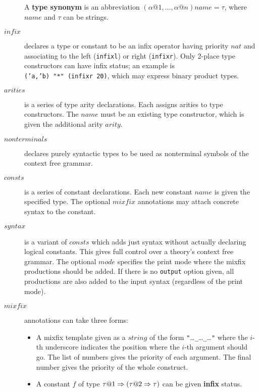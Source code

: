 \begin{description}
  A \textbf{type synonym} is an abbreviation
  $(\alpha@1,\dots,\alpha@n)name = \tau$, where $name$ and $\tau$ can
  be strings.

\item[$infix$]
  declares a type or constant to be an infix operator having priority $nat$
  and associating to the left (\texttt{infixl}) or right (\texttt{infixr}).
  Only 2-place type constructors can have infix status; an example is {\tt
  ('a,'b)~"*"~(infixr~20)}, which may express binary product types.

\item[$arities$] is a series of type arity declarations.  Each assigns
  arities to type constructors.  The $name$ must be an existing type
  constructor, which is given the additional arity $arity$.
  
\item[$nonterminals$] declares purely
  syntactic types to be used as nonterminal symbols of the context
  free grammar.

\item[$consts$] is a series of constant declarations.  Each new
  constant $name$ is given the specified type.  The optional $mixfix$
  annotations may attach concrete syntax to the constant.
  
\item[$syntax$]  is a variant
  of $consts$ which adds just syntax without actually declaring
  logical constants.  This gives full control over a theory's context
  free grammar.  The optional $mode$ specifies the print mode where the
  mixfix productions should be added.  If there is no \texttt{output}
  option given, all productions are also added to the input syntax
  (regardless of the print mode).

\item[$mixfix$] 
  annotations can take three forms:
  \begin{itemize}
  \item A mixfix template given as a $string$ of the form
    {\tt"}\dots{\tt\_}\dots{\tt\_}\dots{\tt"} where the $i$-th underscore
    indicates the position where the $i$-th argument should go.  The list
    of numbers gives the priority of each argument.  The final number gives
    the priority of the whole construct.

  \item A constant $f$ of type $\tau@1\To(\tau@2\To\tau)$ can be given {\bf
    infix} status.


\end{itemize}
\end{description}
